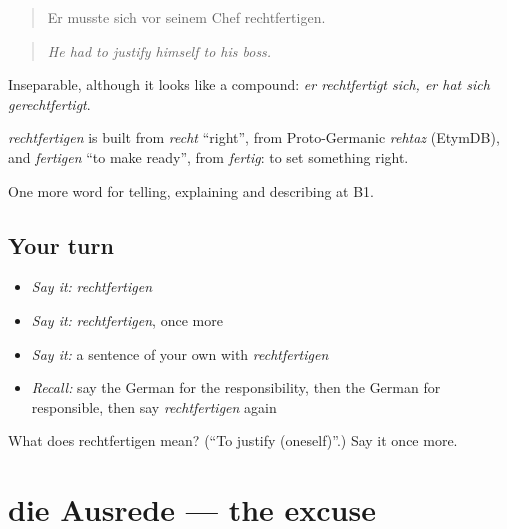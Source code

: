 \begin{quote}
Er musste sich vor seinem Chef rechtfertigen.
\end{quote}

\begin{quote}
\emph{He had to justify himself to his boss.}
\end{quote}

Inseparable, although it looks like a compound: \emph{er rechtfertigt sich, er hat sich gerechtfertigt}.

\begin{cousinweb}
\emph{rechtfertigen} is built from \emph{recht} \textquotedblleft{}right\textquotedblright{}, from Proto-Germanic \emph{rehtaz} (EtymDB), and \emph{fertigen} \textquotedblleft{}to make ready\textquotedblright{}, from \emph{fertig}: to set something right.
\end{cousinweb}

\begin{grammarlens}[title={What you've built}]
One more word for telling, explaining and describing at B1.
\end{grammarlens}

\subsection*{Your turn}
\begin{itemize}
\raggedright
  \item \emph{Say it:} \emph{rechtfertigen}
  \item \emph{Say it:} \emph{rechtfertigen}, once more
  \item \emph{Say it:} a sentence of your own with \emph{rechtfertigen}
  \item \emph{Recall:} say the German for the responsibility, then the German for responsible, then say \emph{rechtfertigen} again
\end{itemize}

\begin{tcolorbox}[breakable,colback=teal!4,colframe=teal!35!black,title={Before you move on}]
What does rechtfertigen mean? (\textquotedblleft{}To justify (oneself)\textquotedblright{}.) Say it once more.
\end{tcolorbox}
\section[die Ausrede]{die Ausrede — the excuse}

\label{lesson:GE-C348-ausrede}



